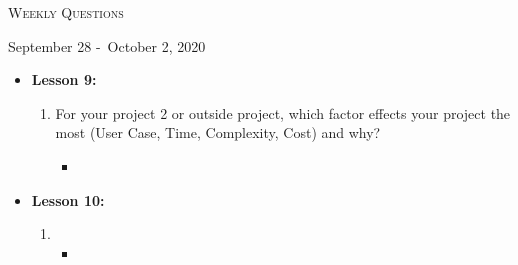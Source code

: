 \centerline{\LARGE\textsc{Weekly Questions}}
\centerline{September 28 -\ October 2, 2020}
\textbf{}
\begin{itemize}
  \item[] \textbf{\large Lesson 9:}
  \begin{enumerate}
    \item For your project 2 or outside project, which factor effects your project the most (User Case, Time, Complexity, Cost) and why?
    \begin{itemize}
      \item 
    \end{itemize}
  \end{enumerate} 
\end{itemize}
\begin{itemize}
  \item[] \textbf{\large Lesson 10:}
  \begin{enumerate}
    \item 
    \begin{itemize}
      \item 
    \end{itemize}
  \end{enumerate} 
\end{itemize}

